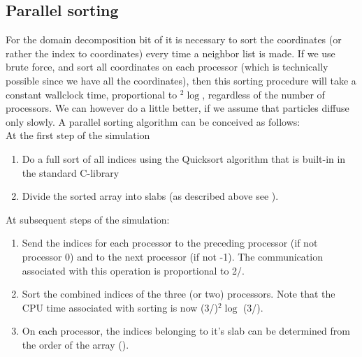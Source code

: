 {\subsection{Parallel sorting}
\label{sec:parsort}
For the domain decomposition bit of {\gromacs} it is necessary to sort the 
coordinates (or rather the index to coordinates) every time a neighbor list is made.
If we use brute force, and sort all coordinates on each processor (which is 
technically possible since we have all the coordinates), then this sorting procedure
will take a constant wallclock time, proportional to {\natom}$^2\log${\natom}, 
regardless of the number of processors. We can however do a little
better, if we assume that particles diffuse only slowly.
A parallel sorting algorithm can be conceived as follows: \\
At the first step of the simulation
\begin{enumerate}
\item   Do a full sort of all indices using {\eg} the  Quicksort algorithm that is
        built-in in the standard C-library
\item   Divide the sorted array into slabs (as described above see 
        ).
\end{enumerate}
At subsequent steps of the simulation:
\begin{enumerate}
\item   Send the indices for each processor to the preceding processor (if
        not processor 0) and to the next processor (if not {\nproc}-1). The 
        communication associated with this operation is proportional to
        2{\natom}/{\nproc}.
\item   Sort the combined indices of the three (or two) processors. Note that
        the CPU time associated with sorting is now
        (3{\natom}/{\nproc})$^2\log$ (3{\natom}/{\nproc}).
\item   On each processor, the indices belonging to it's slab can be determined
        from the order of the array ().
\end{enumerate}

} %
